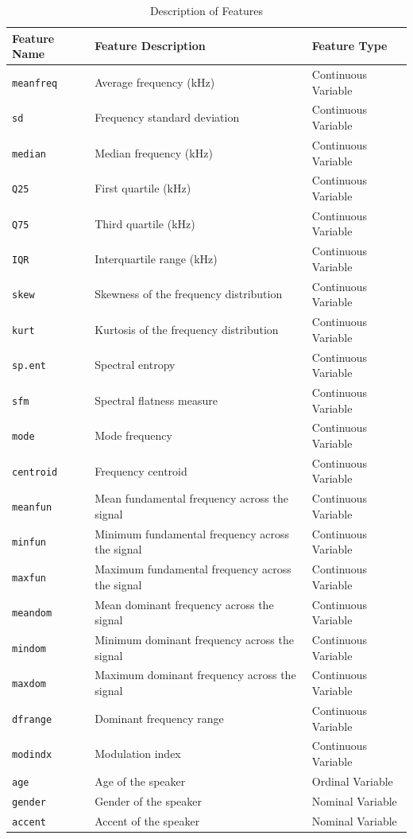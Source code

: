\documentclass{article}
\begin{document}
	{
		\renewcommand{\arraystretch}{1.3}
		\begin{table}
			\centering
			\begin{tabular}{lll}
				\hline
				\textbf{Feature Name} & \textbf{Feature Description} & \textbf{Feature Type} \\
				\hline
				\texttt{meanfreq} & Average frequency (kHz) & Continuous Variable \\
				\texttt{sd} & Frequency standard deviation & Continuous Variable \\
				\texttt{median} & Median frequency (kHz) & Continuous Variable \\
				\texttt{Q25} & First quartile (kHz) & Continuous Variable \\
				\texttt{Q75} & Third quartile (kHz) & Continuous Variable \\
				\texttt{IQR} & Interquartile range (kHz) & Continuous Variable \\
				\texttt{skew} & Skewness of the frequency distribution & Continuous Variable \\
				\texttt{kurt} & Kurtosis of the frequency distribution & Continuous Variable \\
				\texttt{sp.ent} & Spectral entropy & Continuous Variable \\
				\texttt{sfm} & Spectral flatness measure & Continuous Variable \\
				\texttt{mode} & Mode frequency & Continuous Variable \\
				\texttt{centroid} & Frequency centroid & Continuous Variable \\
				\texttt{meanfun} & Mean fundamental frequency across the signal & Continuous Variable \\
				\texttt{minfun} & Minimum fundamental frequency across the signal & Continuous Variable \\
				\texttt{maxfun} & Maximum fundamental frequency across the signal & Continuous Variable \\
				\texttt{meandom} & Mean dominant frequency across the signal & Continuous Variable \\
				\texttt{mindom} & Minimum dominant frequency across the signal & Continuous Variable \\
				\texttt{maxdom} & Maximum dominant frequency across the signal & Continuous Variable \\
				\texttt{dfrange} & Dominant frequency range & Continuous Variable \\
				\texttt{modindx} & Modulation index & Continuous Variable \\
				\texttt{age} & Age of the speaker & Ordinal Variable \\
				\texttt{gender} & Gender of the speaker & Nominal Variable \\
				\texttt{accent} & Accent of the speaker & Nominal Variable \\
				\hline
			\end{tabular}
			\caption{Description of Features}
			\label{table:features_description}
		\end{table}
	}
	
\end{document}
